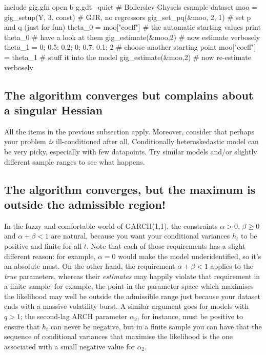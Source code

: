 \documentclass[a4paper,11pt]{article}
\begin{document}
\begin{scode}
include gig.gfn
open b-g.gdt --quiet           # Bollerslev-Ghysels esample dataset
moo = gig_setup(Y, 3, const)   # GJR, no regressors
gig_set_pq(&moo, 2, 1)         # set p and q (just for fun)
theta_0 = moo["coeff"]         # the automatic starting values
print theta_0                  # have a look at them
gig_estimate(&moo,2)           # now estimate verbosely
theta_1 = {0; 0.5; 0.2; 0; 0.7; 0.1; 2} # choose another starting point
moo["coeff"] = theta_1         # stuff it into the model
gig_estimate(&moo,2)           # now re-estimate verbosely
\end{scode}

\subsection{The algorithm converges but complains about a singular
  Hessian}

All the items in the previous subsection apply. Moreover, consider
that perhaps your problem \emph{is} ill-conditioned after
all. Conditionally heteroskedastic model can be very picky, especially
with few datapoints. Try similar models and/or slightly different
sample ranges to see what happens.

\subsection{The algorithm converges, but the maximum is outside the
  admissible region!}

In the fuzzy and comfortable world of GARCH(1,1), the constraints
$\alpha > 0$, $\beta \ge 0$ and $\alpha + \beta < 1$ are natural,
because you want your conditional variances $h_t$ to be positive and
finite for all $t$. Note that each of those requirements has a slight
different reason: for example, $\alpha = 0$ would make the model
underidentified, so it's an absolute must. On the other hand, the
requirement $\alpha + \beta < 1$ applies to the \emph{true}
parameters, whereas their \emph{estimates} may happily violate that
requirement in a finite sample: for example, the point in the
parameter space which maximises the likelihood may well be outside the
admissible range just because your dataset ends with a massive
volatility burst. A similar argument goes for models with $q>1$; the
second-lag ARCH parameter $\alpha_2$, for instance, must be positive to
ensure that $h_t$ can never be negative, but in a finite sample you
can have that the sequence of conditional variances that maximise the
likelihood is the one associated with a small negative value for
$\alpha_2$.
\end{document}
